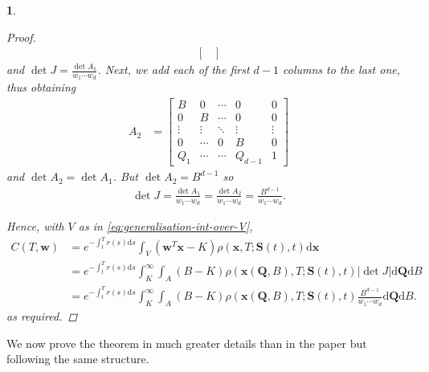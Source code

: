 \documentclass[english]{article}
\numberwithin{equation}{section}
\numberwithin{figure}{section}
\theoremstyle{bolddescit}
\theoremstyle{definition}
\theoremstyle{definition}
\theoremstyle{plain}
\newtheorem{lemma}[theorem]{\protect\lemmaname}
\theoremstyle{plain}
\theoremstyle{bolddesc}
\theoremstyle{plain}
\theoremstyle{remark}
\providecommand{\lemmaname}{Lemma}
\begin{document}
\begin{lemma}
\begin{proof}
\begin{align*}
\begin{bmatrix}
      \end{bmatrix}
    \end{align*}
    and $\det J = \frac{\det A_1}{w_1 \cdots w_d}$. Next, we add each of the first $d-1$ columns to the last one, thus obtaining
    \begin{align*}
      A_2 &= \begin{bmatrix}
        B & 0 & \cdots & 0 & 0\\
        0 & B & \cdots & 0 & 0\\
        \vdots & \vdots & \ddots & \vdots & \vdots\\
        0 & \cdots & 0 & B & 0\\
        Q_1 & \cdots & \cdots & Q_{d-1} & 1
      \end{bmatrix}
    \end{align*}
    and $\det A_2 = \det A_1$. But $\det A_2 = B^{d-1}$ so
    \begin{align*}
      \det J = \frac{\det A_1}{w_1 \cdots w_d} = \frac{\det A_2}{w_1 \cdots w_d} = \frac{B^{d-1}}{w_1 \cdots w_d}.
    \end{align*}

    Hence, with $V$ as in \eqref{eq:generalisation-int-over-V},
    \begin{align*}
      C(T,\mathbf{w})
      &= e^{-\int_t^T r(s) \mathrm{d}s} \int_V \left(\mathbf{w}^T\mathbf{x} - K\right) \rho(\mathbf{x},T;\mathbf{S}(t),t) \mathrm{d}\mathbf{x}\\
      &= e^{-\int_t^T r(s) \mathrm{d}s} \int_K^\infty \int_A \left(B - K\right) \rho(\mathbf{x}(\mathbf{Q},B),T;\mathbf{S}(t),t) |\det J| \mathrm{d}\mathbf{Q} \mathrm{d}B\\
      &= e^{-\int_t^T r(s) \mathrm{d}s} \int_K^\infty \int_A \left(B - K\right) \rho(\mathbf{x}(\mathbf{Q},B),T;\mathbf{S}(t),t) \frac{B^{d-1}}{w_1 \cdots w_d} \mathrm{d}\mathbf{Q} \mathrm{d}B.
    \end{align*}
    as required.
  \end{proof}
\end{lemma}

We now prove the theorem in much greater details than in the paper but following the same structure.
\end{document}
